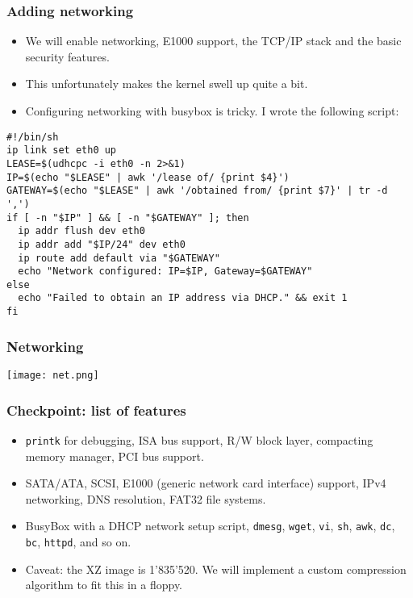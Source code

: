 \documentclass{beamer}
\begin{document}
\begin{frame}[t,fragile]
\frametitle{Adding networking}
\begin{itemize}
  \item We will enable networking, E1000 support, the TCP/IP stack and the basic security features.
  \item This unfortunately makes the kernel swell up quite a bit.
  \item Configuring networking with busybox is tricky. I wrote the following script:
\end{itemize}
\begin{verbatim}
#!/bin/sh
ip link set eth0 up
LEASE=$(udhcpc -i eth0 -n 2>&1)
IP=$(echo "$LEASE" | awk '/lease of/ {print $4}')
GATEWAY=$(echo "$LEASE" | awk '/obtained from/ {print $7}' | tr -d ',')
if [ -n "$IP" ] && [ -n "$GATEWAY" ]; then
  ip addr flush dev eth0
  ip addr add "$IP/24" dev eth0
  ip route add default via "$GATEWAY"
  echo "Network configured: IP=$IP, Gateway=$GATEWAY"
else
  echo "Failed to obtain an IP address via DHCP." && exit 1
fi
\end{verbatim}
\end{frame}

\begin{frame}[t,fragile]
\frametitle{Networking}
\begin{center}
  \texttt{[image: net.png]}
\end{center}
\end{frame}

\begin{frame}[t,fragile]
\frametitle{Checkpoint: list of features}
\begin{itemize}
  \item \verb|printk| for debugging, ISA bus support, R/W block layer, compacting memory manager, PCI bus support.
  \item SATA/ATA, SCSI, E1000 (generic network card interface) support, IPv4 networking, DNS resolution, FAT32 file systems.
  \item BusyBox with a DHCP network setup script, \verb|dmesg|, \verb|wget|, \verb|vi|, \verb|sh|, \verb|awk|, \verb|dc|, \verb|bc|, \verb|httpd|, and so on.
  \item Caveat: the XZ image is 1'835'520. We will implement a custom compression algorithm to fit this in a floppy.
\end{itemize}
\end{frame}
\end{document}

